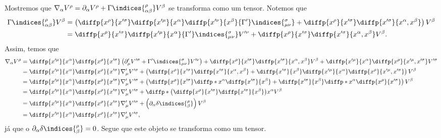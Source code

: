 Mostremos que \(\nabla_{\alpha} V^\rho = \partial_\alpha V^\rho + \Gamma\indices{^\rho_{\alpha \beta}}V^\beta\) se transforma como um tensor. Notemos que
\begin{align*}
    \Gamma\indices{^\rho_{\alpha \beta}}V^\beta &= \left(\diffp{x^\rho}{x'^\sigma}\diffp{x'^\mu}{x^\alpha} \diffp{x'^\nu}{x^\beta}{\Gamma'}\indices{^\sigma_{\mu\nu}} + \diffp{x^\rho}{x'^\sigma}\diffp{x'^\sigma}{x^\alpha,x^\beta}\right)V^\beta\\
                                                &= \diffp{x^\rho}{x'^\sigma}\diffp{x'^\mu}{x^\alpha} {\Gamma'}\indices{^\sigma_{\mu\nu}}V'^\nu + \diffp{x^\rho}{x'^\sigma}\diffp{x'^\sigma}{x^\alpha,x^\beta}V^\beta.
\end{align*}
Assim, temos que
\begin{align*}
    \nabla_\alpha V^\rho &= \diffp{x'^\mu}{x^\alpha}\diffp{x^\rho}{x'^\sigma}\left(\partial'_\mu V'^\sigma + {\Gamma'}\indices{^\sigma_{\mu\nu}}V'^\nu\right)+ \diffp{x^\rho}{x'^\sigma}\diffp{x'^\sigma}{x^\alpha,x^\beta}V^\beta + \diffp{x'^\mu}{x^\alpha} \diffp{x^\rho}{x'^\mu,x'^\sigma} V'^\sigma\\
                         &=\diffp{x'^\mu}{x^\alpha}\diffp{x^\rho}{x'^\sigma}\nabla'_\mu V'^\sigma + \left(\diffp{x^\rho}{x'^\sigma}\diffp{x'^\sigma}{x^\alpha,x^\beta} + \diffp{x'^\sigma}{x^\beta}\diffp{x'^\mu}{x^\alpha} \diffp{x^\rho}{x'^\mu,x'^\sigma}\right) V^\beta\\
                         &=\diffp{x'^\mu}{x^\alpha}\diffp{x^\rho}{x'^\sigma}\nabla'_\mu V'^\sigma + \left(\diffp{x^\rho}{x'^\sigma}\diffp*{}{x^\alpha}\diffp{x'^\sigma}{x^\beta} + \diffp{x'^\sigma}{x^\beta}\diffp*{}{x^\alpha} \diffp{x^\rho}{x'^\sigma}\right) V^\beta\\
                         &=\diffp{x'^\mu}{x^\alpha}\diffp{x^\rho}{x'^\sigma}\nabla'_\mu V'^\sigma + \diffp*{\left(\diffp{x^\rho}{x'^\sigma} \diffp{x'^\sigma}{x^\beta}\right)}{x^\alpha} V^\beta\\
                         &=\diffp{x'^\mu}{x^\alpha}\diffp{x^\rho}{x'^\sigma}\nabla'_\mu V'^\sigma + \left(\partial_\alpha \delta\indices{^{\rho}_{\beta}}\right)V^\beta\\
                         &=\diffp{x'^\mu}{x^\alpha}\diffp{x^\rho}{x'^\sigma}\nabla'_\mu V'^\sigma,
\end{align*}
já que o \(\partial_\alpha \delta\indices{^\rho_\beta} = 0\). Segue que este objeto se transforma como um tensor.

